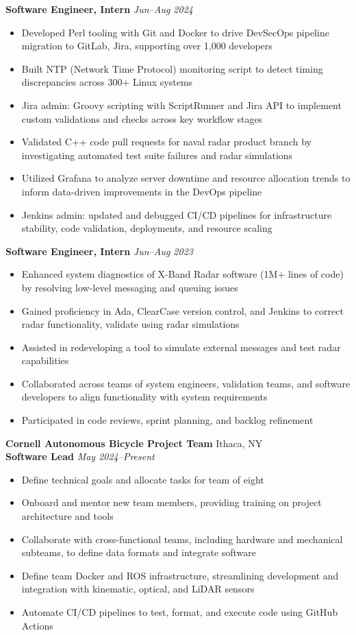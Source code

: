 \documentclass[letterpaper,10pt]{article}
\newcommand{\company}[2]{
    \vspace{6pt}
    {\large \textbf{#1}}
    \hfill
    {\normalsize {#2}}
    \\
}
\newcommand{\position}[2]{
    \vspace{4pt}
    {\normalsize \textbf {#1}}
    \hfill
    {\normalsize \textit{#2}}
    \\
}
\newcommand{\itemsBegin}{
    \begin{itemize}[leftmargin=0.2in, labelsep=0.05in, itemsep=0pt, parsep=1pt, topsep=0pt, partopsep=0pt]
}
\newcommand{\itemsEnd}{\end{itemize}}
\begin{document}
    \position{Software Engineer, Intern}{Jun--Aug 2024}
    \itemsBegin{}
        \item Developed Perl tooling with Git and Docker to drive DevSecOps pipeline migration to GitLab, Jira, supporting over 1,000 developers
        \item Built NTP (Network Time Protocol) monitoring script to detect timing discrepancies across 300+ Linux systems
        \item Jira admin: Groovy scripting with ScriptRunner and Jira API to implement custom validations and checks across key workflow stages
        \item Validated C++ code pull requests for naval radar product branch by investigating automated test suite failures and radar simulations
        \item Utilized Grafana to analyze server downtime and resource allocation trends to inform data-driven improvements in the DevOps pipeline
        \item Jenkins admin: updated and debugged CI/CD pipelines for infrastructure stability, code validation, deployments, and resource scaling
    \itemsEnd{}

    \position{Software Engineer, Intern}{Jun--Aug 2023}
    \itemsBegin{}
        \item Enhanced system diagnostics of X-Band Radar software (1M+ lines of code) by resolving low-level messaging and queuing issues
        \item Gained proficiency in Ada, ClearCase version control, and Jenkins to correct radar functionality, validate using radar simulations
        \item Assisted in redeveloping a tool to simulate external messages and test radar capabilities
        \item Collaborated across teams of system engineers, validation teams, and software developers to align functionality with system requirements
        \item Participated in code reviews, sprint planning, and backlog refinement
    \itemsEnd{}

    \company{Cornell Autonomous Bicycle Project Team}{Ithaca, NY}

    \position{Software Lead}{May 2024--Present}
    \itemsBegin{}
        \item Define technical goals and allocate tasks for team of eight
        \item Onboard and mentor new team members, providing training on project architecture and tools
        \item Collaborate with cross-functional teams, including hardware and mechanical subteams, to define data formats and integrate software
        \item Define team Docker and ROS infrastructure, streamlining development and integration with kinematic, optical, and LiDAR sensors
        \item Automate CI/CD pipelines to test, format, and execute code using GitHub Actions
    \itemsEnd{}
\end{document}
